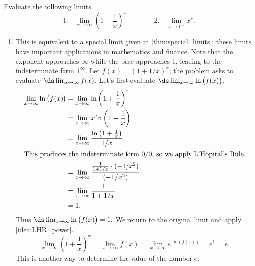 {Evaluate the following limits.
\[
 \text{1.}\quad\lim_{x\to\infty} \left(1+\frac1x\right)^x \qquad\qquad
 \text{2.}\quad\lim_{x\to0^+} x^x.
\]}
{\begin{enumerate}
\item		This is equivalent to a special limit given in \autoref{thm:special_limits}; these limits have important applications in mathematics and finance. Note that the exponent approaches $\infty$ while the base approaches 1, leading to the indeterminate form $1^\infty$. Let $f(x) = (1+1/x)^x$; the problem asks to evaluate $\ds\lim_{x\to\infty}f(x)$. Let's first evaluate $\ds \lim_{x\to\infty}\ln\big(f(x)\big)$.
\begin{align*}
\lim_{x\to\infty}\ln\big(f(x)\big)
			&= \lim_{x\to\infty} \ln \left(1+\frac1x\right)^x \\
			&= \lim_{x\to\infty} x\ln\left(1+\frac1x\right)\\
			&= \lim_{x\to\infty} \frac{\ln\left(1+\frac1x\right)}{1/x}\\
			\intertext{This produces the indeterminate form 0/0, so we apply L'H\^opital's Rule.}
			&=	\lim_{x\to\infty} \frac{\frac{1}{1+1/x}\cdot(-1/x^2)}{(-1/x^2)} \\
			&= \lim_{x\to\infty}\frac{1}{1+1/x}\\
			&= 1.
\end{align*}
Thus $\ds\lim_{x\to\infty} \ln \big(f(x)\big) = 1.$ We return to the original limit and apply \autoref{idea:LHR_power}.
\[\lim_{x\to\infty}\left(1+\frac1x\right)^x = \lim_{x\to\infty} f(x) =  \lim_{x\to\infty}e^{\ln (f(x))} = e^1 = e.\]
This is another way to determine the value of the number $e$.


\end{enumerate}}
